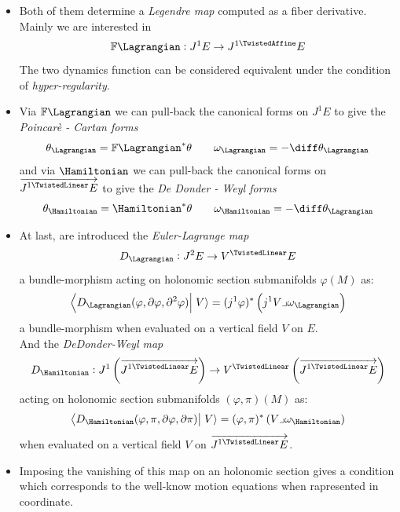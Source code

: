 \documentclass[a4paper,12pt]{scrartcl}  %
\renewcommand{\AffDualJet}{ J^{1 \TwistedAffine}E }
\renewcommand{\LinDualJet}{ \overrightarrow{J^{1 \TwistedLinear}E} }
\begin{document}
\begin{itemize}
\item Both of them determine a \emph{Legendre map} computed as a fiber derivative.
	Mainly we are interested  in
	\begin{displaymath}
		\mathbb{F} \Lagrangian : J^1 E \rightarrow \AffDualJet		
	\end{displaymath}
	The two dynamics function can be considered equivalent under the condition of \emph{hyper-regularity}\cite[chapter, p.~215]{Gimmsy}.

\item Via $\mathbb{F} \Lagrangian$ we can pull-back the canonical forms on $J^1 E$ to give the \emph{Poincarè - Cartan forms}
	\begin{displaymath}
		\theta_\Lagrangian = \mathbb{F} \Lagrangian^\ast \theta \qquad \omega_\Lagrangian = - \diff \theta_\Lagrangian
	\end{displaymath}
	and via $\Hamiltonian$ we can pull-back the canonical forms on $\LinDualJet$ to give the \emph{De Donder - Weyl forms}
	\begin{displaymath}
		\theta_\Hamiltonian = \Hamiltonian^\ast \theta \qquad \omega_\Hamiltonian = - \diff \theta_\Lagrangian
	\end{displaymath}
	
\item At last, are introduced the \emph{Euler-Lagrange map}
	\begin{displaymath}
		D_\Lagrangian : J^2 E \rightarrow V^\TwistedLinear E
	\end{displaymath}
	 a bundle-morphism acting on holonomic section submanifolds $\varphi(M)$ as:
	\begin{displaymath}
		\left\langle D_\Lagrangian(\varphi, \partial \varphi , \partial^2 \varphi) \right\vert \left. V \right\rangle = (j^1 \varphi)^\ast \left( j^1V \lrcorner \omega_\Lagrangian \right)
	\end{displaymath}
	 a bundle-morphism when evaluated on a vertical field $V$ on $E$. \\
	And the \emph{DeDonder-Weyl map}
	\begin{displaymath}
		D_\Hamiltonian : J^1\left(\LinDualJet \right) \rightarrow V^\TwistedLinear \left(\LinDualJet \right)
	\end{displaymath}
	acting on holonomic section submanifolds $(\varphi, \pi)(M)$ as:
	\begin{displaymath}
		\left\langle D_\Hamiltonian(\varphi, \pi, \partial \varphi , \partial \pi) \right\vert \left. V \right\rangle = (\varphi, \pi)^\ast \left( V \lrcorner \omega_\Hamiltonian \right)
	\end{displaymath}	
	when evaluated on a vertical field $V$ on $\LinDualJet$.
	
\item	
	Imposing the vanishing of this map on an holonomic section gives a condition which corresponds to the well-know motion equations when rapresented in coordinate.

\end{itemize}
\end{document}
